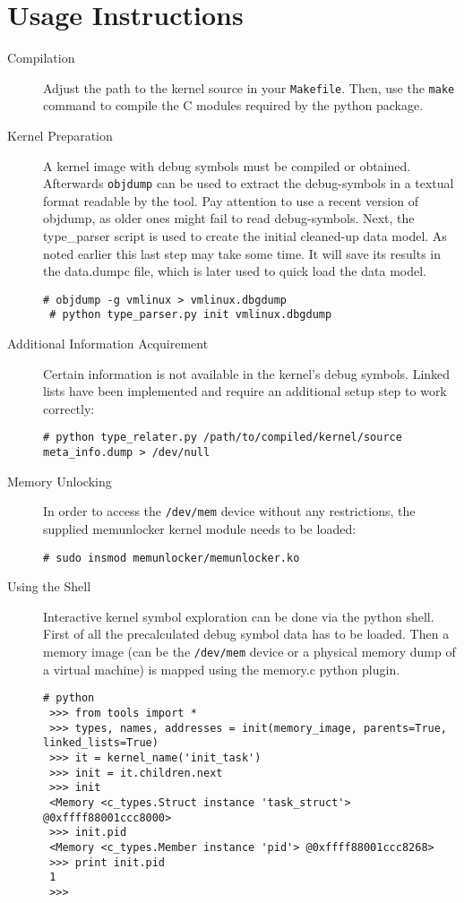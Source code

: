 \section{Usage Instructions}
\begin{description}
    \item[Compilation]
	Adjust the path to the kernel source in your \texttt{Makefile}.
	Then, use the \texttt{make} command to compile the C modules required by the python package.
    \item[Kernel Preparation]
        A kernel image with debug symbols must be compiled or obtained.
        Afterwards \texttt{objdump} can be used to extract the debug-symbols in a textual format readable by the tool.
        Pay attention to use a recent version of objdump, as older ones might fail to read debug-symbols.
        Next, the type\_parser script is used to create the initial cleaned-up data model.
        As noted earlier this last step may take some time.
        It will save its results in the data.dumpc file, which is later used to quick load the data model.
        \begin{lstlisting}[frame=single,caption=Initialisation Workflow,label=lst:workflow]
 # objdump -g vmlinux > vmlinux.dbgdump
 # python type_parser.py init vmlinux.dbgdump
        \end{lstlisting}
    \item[Additional Information Acquirement]
	Certain information is not available in the kernel’s debug symbols.
	Linked lists have been implemented and require an additional setup step to work correctly:
        \begin{lstlisting}[frame=single,caption=Linked List Initialisation Workflow,label=lst:workflow]
 # python type_relater.py /path/to/compiled/kernel/source meta_info.dump > /dev/null
        \end{lstlisting}
    \item[Memory Unlocking]
        In order to access the \texttt{/dev/mem} device without any restrictions, the supplied memunlocker kernel module needs to 		be loaded: \begin{lstlisting}[frame=single,caption=Unblocking /dev/mem,label=lst:unlocking]
 # sudo insmod memunlocker/memunlocker.ko
         \end{lstlisting}
    \item[Using the Shell]
	Interactive kernel symbol exploration can be done via the python shell. First of all the precalculated debug symbol data 		has to be loaded. Then a memory image (can be the \texttt{/dev/mem} device or a physical memory dump of a virtual machine) 		is mapped using the memory.c python plugin.
	\begin{lstlisting}[frame=single,caption=Starting up interactive shell,label=lst:shellstartup]
 # python
 >>> from tools import *
 >>> types, names, addresses = init(memory_image, parents=True, linked_lists=True)
 >>> it = kernel_name('init_task')
 >>> init = it.children.next
 >>> init
 <Memory <c_types.Struct instance 'task_struct'> @0xffff88001ccc8000>
 >>> init.pid
 <Memory <c_types.Member instance 'pid'> @0xffff88001ccc8268>
 >>> print init.pid
 1
 >>> 
	\end{lstlisting}	


\end{description}
